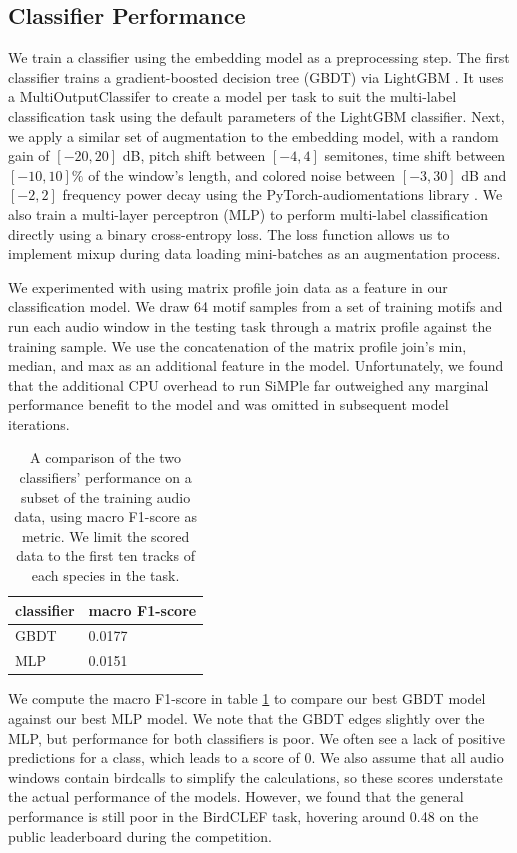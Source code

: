 \documentclass[
]{ceurart}
\begin{document}
\subsection{Classifier Performance}

We train a classifier using the embedding model as a preprocessing step. The first classifier trains a gradient-boosted decision tree (GBDT) via LightGBM \cite{ke2017lightgbm}. It uses a MultiOutputClassifer to create a model per task to suit the multi-label classification task using the default parameters of the LightGBM classifier. Next, we apply a similar set of augmentation to the embedding model, with a random gain of $[-20, 20]$ dB, pitch shift between $[-4, 4]$ semitones, time shift between $[-10, 10]\%$ of the window's length, and colored noise between $[-3, 30]$ dB and $[-2, 2]$ frequency power decay using the PyTorch-audiomentations library \cite{pytorch-audiomentations}. We also train a multi-layer perceptron (MLP) to perform multi-label classification directly using a binary cross-entropy loss. The loss function allows us to implement mixup \cite{zhang2017mixup} during data loading mini-batches as an augmentation process.

We experimented with using matrix profile join data as a feature in our classification model. We draw 64 motif samples from a set of training motifs and run each audio window in the testing task through a matrix profile against the training sample. We use the concatenation of the matrix profile join's min, median, and max as an additional feature in the model. Unfortunately, we found that the additional CPU overhead to run SiMPle far outweighed any marginal performance benefit to the model and was omitted in subsequent model iterations.

\begin{table}[h]
\begin{tabular}{|l|l|}
\hline
classifier     & macro F1-score \\ \hline
GBDT           & 0.0177         \\ \hline
MLP            & 0.0151         \\ \hline
\end{tabular}
\caption{A comparison of the two classifiers' performance on a subset of the training audio data, using macro F1-score as metric. We limit the scored data to the first ten tracks of each species in the task.}
\label{tab:f1-score}
\end{table}

We compute the macro F1-score in table \ref{tab:f1-score} to compare our best GBDT model against our best MLP model. We note that the GBDT edges slightly over the MLP, but performance for both classifiers is poor. We often see a lack of positive predictions for a class, which leads to a score of 0. We also assume that all audio windows contain birdcalls to simplify the calculations, so these scores understate the actual performance of the models. However, we found that the general performance is still poor in the BirdCLEF task, hovering around 0.48 on the public leaderboard during the competition.
\end{document}
